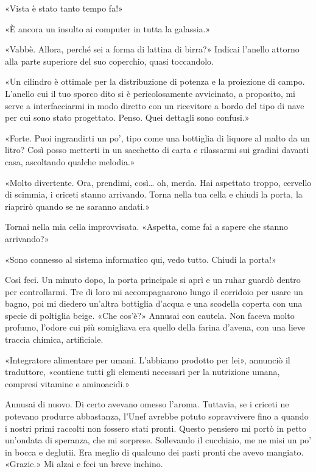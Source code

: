 «Vista è stato tanto tempo fa!»

«È ancora un insulto ai computer in tutta la galassia.»

«Vabbè. Allora, perché sei a forma di lattina di birra?» Indicai
l'anello attorno alla parte superiore del suo coperchio, quasi
toccandolo.

«Un cilindro è ottimale per la distribuzione di potenza e la proiezione
di campo. L'anello cui il tuo sporco dito si è pericolosamente
avvicinato, a proposito, mi serve a interfacciarmi in modo diretto con
un ricevitore a bordo del tipo di nave per cui sono stato progettato.
Penso. Quei dettagli sono confusi.»

«Forte. Puoi ingrandirti un po', tipo come una bottiglia di liquore al
malto da un litro? Così posso metterti in un sacchetto di carta e
rilassarmi sui gradini davanti casa, ascoltando qualche melodia.»

«Molto divertente. Ora, prendimi, così\ldots{} oh, merda. Hai aspettato
troppo, cervello di scimmia, i criceti stanno arrivando. Torna nella tua
cella e chiudi la porta, la riaprirò quando se ne saranno andati.»

Tornai nella mia cella improvvisata. «Aspetta, come fai a sapere che
stanno arrivando?»

«Sono connesso al sistema informatico qui, vedo tutto. Chiudi la porta!»

Così feci. Un minuto dopo, la porta principale si aprì e un ruhar guardò
dentro per controllarmi. Tre di loro mi accompagnarono lungo il
corridoio per usare un bagno, poi mi diedero un'altra bottiglia d'acqua
e una scodella coperta con una specie di poltiglia beige. «Che cos'è?»
Annusai con cautela. Non faceva molto profumo, l'odore cui più
somigliava era quello della farina d'avena, con una lieve traccia
chimica, artificiale.

«Integratore alimentare per umani. L'abbiamo prodotto per lei», annunciò
il traduttore, «contiene tutti gli elementi necessari per la nutrizione
umana, compresi vitamine e aminoacidi.»

Annusai di nuovo. Di certo avevano omesso l'aroma. Tuttavia, se i
criceti ne potevano produrre abbastanza, l'Unef avrebbe potuto
sopravvivere fino a quando i nostri primi raccolti non fossero stati
pronti. Questo pensiero mi portò in petto un'ondata di speranza, che mi
sorprese. Sollevando il cucchiaio, me ne misi un po' in bocca e
deglutii. Era meglio di qualcuno dei pasti pronti che avevo mangiato.
«Grazie.» Mi alzai e feci un breve inchino.

